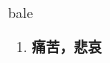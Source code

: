 
\begin{frame}
{\huge bale}
\begin{center}
\begin{enumerate}\Large
  \item \textbf{痛苦，悲哀}
\end{enumerate}
\end{center}
\end{frame}
